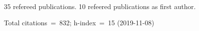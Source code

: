 35 refereed publications. 10 refeered publications as first author.

Total citations~=~832; h-index~=~15 (2019-11-08)
